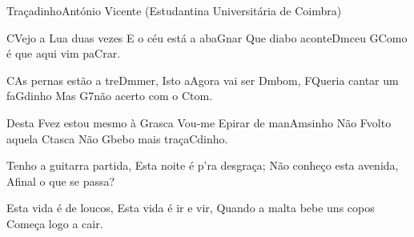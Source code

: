 \begin{musica}{Traçadinho}{António Vicente (Estudantina Universitária de Coimbra)}{}

\ac{C}{Ve}jo a Lua duas vezes
E o céu está a aba\ac{G}{nar}
Que diabo aconte\ac{Dm}{ceu}
\ac{G}{Co}mo é que aqui vim pa\ac{C}{rar}.

\ac{C}{As} pernas estão a tre\ac{Dm}{mer},
Isto a\ac{A}{go}ra vai ser \ac{Dm}{bom},
\ac{F}{Que}ria cantar um fa\ac{G}{di}nho
Mas \ac{G7}{não} acerto com o \ac{C}{tom}.

Desta \ac{F}{vez} estou mesmo à \ac{G}{ras}ca
Vou-me \ac{E}{pi}rar de man\ac{Am}{si}nho
Não \ac{F}{vol}to aquela \ac{C}{tas}ca
Não \ac{G}{be}bo mais traça\ac{C}{di}nho.


Tenho a guitarra partida,
Esta noite é p'ra desgraça;
Não conheço esta avenida,
Afinal o que se passa?

Esta vida é de loucos,
Esta vida é ir e vir,
Quando a malta bebe uns copos
Começa logo a cair.


\end{musica}
